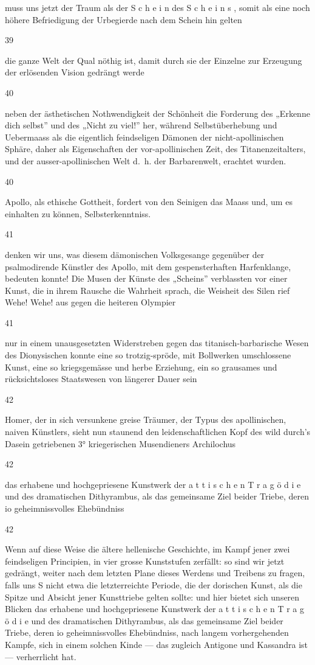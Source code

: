 \documentclass[
  letterpaper,
  DIV=11,
  numbers=noendperiod]{scrartcl}
\begin{document}
muss uns jetzt der Traum als der S c h e i n des S c h e i n s , somit
als eine noch höhere Befriedigung der Urbegierde nach dem Schein hin
gelten

39

die ganze Welt der Qual nöthig ist, damit durch sie der Einzelne zur
Erzeugung der erlösenden Vision gedrängt werde

40

neben der ästhetischen Nothwendigkeit der Schönheit die Forderung des
„Erkenne dich selbst'' und des „Nicht zu viel!'' her, während
Selbstüberhebung und Uebermaass als die eigentlich feindseligen Dämonen
der nicht-apollinischen Sphäre, daher als Eigenschaften der
vor-apollinischen Zeit, des Titanenzeitalters, und der
ausser-apollinischen Welt d.~h. der Barbarenwelt, erachtet wurden.

40

Apollo, als ethische Gottheit, fordert von den Seinigen das Maass und,
um es einhalten zu können, Selbsterkenntniss.

41

denken wir uns, was diesem dämonischen Volksgesange gegenüber der
psalmodirende Künstler des Apollo, mit dem gespensterhaften
Harfenklange, bedeuten konnte! Die Musen der Künste des „Scheins''
verblassten vor einer Kunst, die in ihrem Rausche die Wahrheit sprach,
die Weisheit des Silen rief Wehe! Wehe! aus gegen die heiteren Olympier

41

nur in einem unausgesetzten Widerstreben gegen das titanisch-barbarische
Wesen des Dionysischen konnte eine so trotzig-spröde, mit Bollwerken
umschlossene Kunst, eine so kriegsgemässe und herbe Erziehung, ein so
grausames und rücksichtsloses Staatswesen von längerer Dauer sein

42

Homer, der in sich versunkene greise Träumer, der Typus des
apollinischen, naiven Künstlers, sieht nun staunend den
leidenschaftlichen Kopf des wild durch's Dasein getriebenen 3°
kriegerischen Musendieners Archilochus

42

das erhabene und hochgepriesene Kunstwerk der a t t i s c h e n T r a g
ö d i e und des dramatischen Dithyrambus, als das gemeinsame Ziel beider
Triebe, deren io geheimnissvolles Ehebündniss

42

Wenn auf diese Weise die ältere hellenische Geschichte, im Kampf jener
zwei feindseligen Principien, in vier grosse Kunststufen zerfällt: so
sind wir jetzt gedrängt, weiter nach dem letzten Plane dieses Werdens
und Treibens zu fragen, falls uns S nicht etwa die letzterreichte
Periode, die der dorischen Kunst, als die Spitze und Absicht jener
Kunsttriebe gelten sollte: und hier bietet sich unseren Blicken das
erhabene und hochgepriesene Kunstwerk der a t t i s c h e n T r a g ö d
i e und des dramatischen Dithyrambus, als das gemeinsame Ziel beider
Triebe, deren io geheimnissvolles Ehebündniss, nach langem
vorhergehenden Kampfe, sich in einem solchen Kinde --- das zugleich
Antigone und Kassandra ist --- verherrlicht hat.
\end{document}
